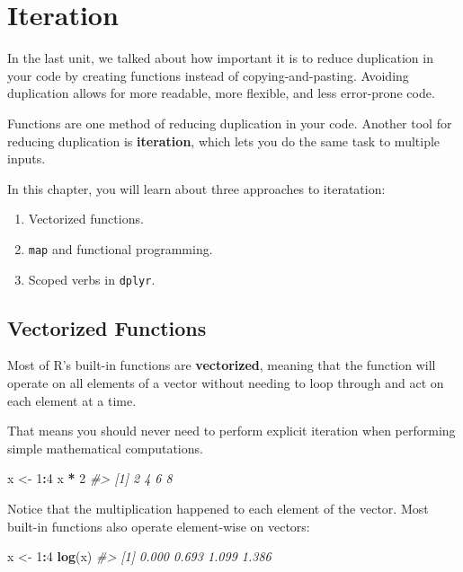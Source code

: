 \documentclass[
]{book}
\newenvironment{Shaded}{\begin{snugshade}}{\end{snugshade}}
\newcommand{\CommentTok}[1]{\textcolor[rgb]{0.56,0.35,0.01}{\textit{#1}}}
\newcommand{\DecValTok}[1]{\textcolor[rgb]{0.00,0.00,0.81}{#1}}
\newcommand{\KeywordTok}[1]{\textcolor[rgb]{0.13,0.29,0.53}{\textbf{#1}}}
\newcommand{\NormalTok}[1]{#1}
\newcommand{\OperatorTok}[1]{\textcolor[rgb]{0.81,0.36,0.00}{\textbf{#1}}}
\newcommand{\StringTok}[1]{\textcolor[rgb]{0.31,0.60,0.02}{#1}}
\providecommand{\tightlist}{%
  \setlength{\itemsep}{0pt}\setlength{\parskip}{0pt}}
\begin{document}
\hypertarget{iteration}{%
\section{Iteration}\label{iteration}}

In the last unit, we talked about how important it is to reduce duplication in your code by creating functions instead of copying-and-pasting. Avoiding duplication allows for more readable, more flexible, and less error-prone code.

Functions are one method of reducing duplication in your code. Another tool for reducing duplication is \textbf{iteration}, which lets you do the same task to multiple inputs.

In this chapter, you will learn about three approaches to iteratation:

\begin{enumerate}
\def\labelenumi{\arabic{enumi}.}
\tightlist
\item
  Vectorized functions.
\item
  \texttt{map} and functional programming.
\item
  Scoped verbs in \texttt{dplyr}.
\end{enumerate}

\hypertarget{vectorized-functions}{%
\subsection{Vectorized Functions}\label{vectorized-functions}}

Most of R's built-in functions are \textbf{vectorized}, meaning that the function will operate on all elements of a vector without needing to loop through and act on each element at a time.

That means you should never need to perform explicit iteration when performing simple mathematical computations.

\begin{Shaded}
\begin{Highlighting}[]
\NormalTok{x <-}\StringTok{ }\DecValTok{1}\OperatorTok{:}\DecValTok{4}
\NormalTok{x }\OperatorTok{*}\StringTok{ }\DecValTok{2}
\CommentTok{#> [1] 2 4 6 8}
\end{Highlighting}
\end{Shaded}

Notice that the multiplication happened to each element of the vector. Most built-in functions also operate element-wise on vectors:

\begin{Shaded}
\begin{Highlighting}[]
\NormalTok{x <-}\StringTok{ }\DecValTok{1}\OperatorTok{:}\DecValTok{4}
\KeywordTok{log}\NormalTok{(x)}
\CommentTok{#> [1] 0.000 0.693 1.099 1.386}
\end{Highlighting}
\end{Shaded}
\end{document}
